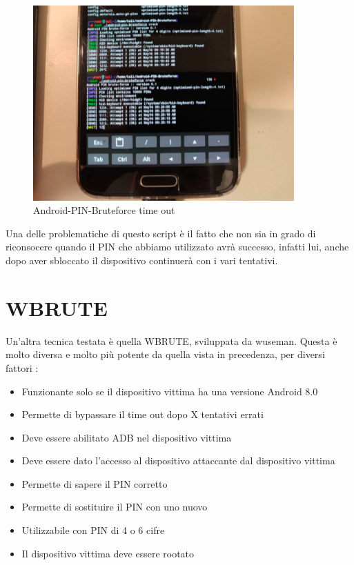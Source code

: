 \begin{figure}[h!]
    \centering
    \includegraphics[width=100mm]{Immagini/3/time_out.png}
    \caption{Android-PIN-Bruteforce time out}
    \label{fig:Android-PIN-Bruteforce}
\end{figure}

Una delle problematiche di questo script è il fatto che non sia in grado di riconsocere quando il PIN che abbiamo utilizzato avrà successo, infatti lui, anche dopo aver sbloccato il dispositivo continuerà con i vari tentativi.

\section{WBRUTE}

Un’altra tecnica testata è quella WBRUTE\cite{wbrute}, sviluppata da wuseman. Questa è molto diversa e molto più potente da quella vista in precedenza, per diversi fattori :

\begin{itemize}
	\item Funzionante solo se il dispositivo vittima ha una versione Android 8.0
	\item Permette di bypassare il time out dopo X tentativi errati
	\item Deve essere abilitato ADB nel dispositivo vittima
	\item Deve essere dato l’accesso al dispositivo attaccante dal dispositivo vittima
	\item Permette di sapere il PIN corretto
	\item Permette di sostituire il PIN con uno nuovo
	\item Utilizzabile con PIN di 4 o 6 cifre
	\item Il dispositivo vittima deve essere rootato
\end{itemize}

